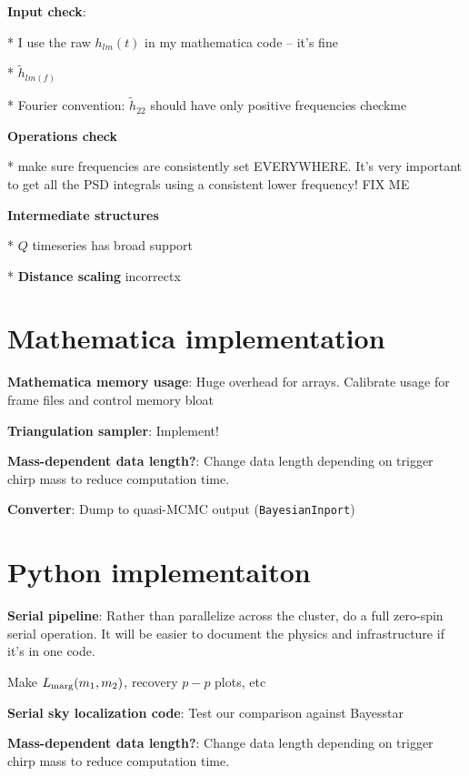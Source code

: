 \documentclass[twocolumn,prd,nofootinbib]{revtex4}
\newcommand\editremark[1]{{\color{red} #1}}
\begin{document}
\noindent \textbf{Input check}: 

* I use the raw $h_{lm}(t)$ in my mathematica code -- it's fine

* $\tilde{h}_{lm(f)}$

* Fourier convention: $\tilde{h}_{22}$ should have only positive frequencies \editremark{checkme}

\noindent \textbf{Operations check}

* make sure frequencies are consistently set EVERYWHERE.  It's very important to get all the PSD integrals using a
consistent lower frequency! \editremark{FIX ME}

\noindent \textbf{Intermediate structures}



* $Q$ timeseries has broad support

* \textbf{Distance scaling} incorrectx

\section{Mathematica implementation}

\noindent \textbf{Mathematica memory usage}: Huge overhead for arrays.  Calibrate usage for frame files and control
memory bloat

\noindent \textbf{Triangulation sampler}: Implement!

\noindent \textbf{Mass-dependent data length?}: Change data length depending on trigger chirp mass to reduce computation time.


\noindent \textbf{Converter}: Dump to quasi-MCMC output (\texttt{BayesianInport})

\section{Python implementaiton}

\noindent \textbf{Serial pipeline}: Rather than parallelize across the cluster, do a full zero-spin serial operation.
It will be easier to document the physics and infrastructure if it's in one code.

Make $L_{\rm marg}(m_1,m_2)$, recovery $p-p$ plots, etc

\noindent \textbf{Serial sky localization code}: Test our comparison against Bayesstar

\noindent \textbf{Mass-dependent data length?}: Change data length depending on trigger chirp mass to reduce computation time.
\end{document}
